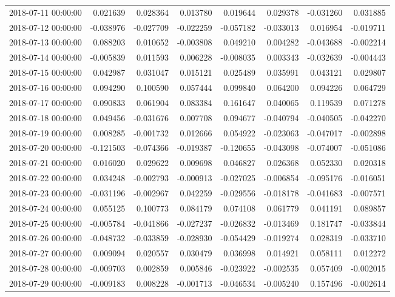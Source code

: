 \begin{tabular}{lrrrrrrr}
2018-07-11 00:00:00 & 0.021639 & 0.028364 & 0.013780 & 0.019644 & 0.029378 & -0.031260 & 0.031885 \\
2018-07-12 00:00:00 & -0.038976 & -0.027709 & -0.022259 & -0.057182 & -0.033013 & 0.016954 & -0.019711 \\
2018-07-13 00:00:00 & 0.088203 & 0.010652 & -0.003808 & 0.049210 & 0.004282 & -0.043688 & -0.002214 \\
2018-07-14 00:00:00 & -0.005839 & 0.011593 & 0.006228 & -0.008035 & 0.003343 & -0.032639 & -0.004443 \\
2018-07-15 00:00:00 & 0.042987 & 0.031047 & 0.015121 & 0.025489 & 0.035991 & 0.043121 & 0.029807 \\
2018-07-16 00:00:00 & 0.094290 & 0.100590 & 0.057444 & 0.099840 & 0.064200 & 0.094226 & 0.064729 \\
2018-07-17 00:00:00 & 0.090833 & 0.061904 & 0.083384 & 0.161647 & 0.040065 & 0.119539 & 0.071278 \\
2018-07-18 00:00:00 & 0.049456 & -0.031676 & 0.007708 & 0.094677 & -0.040794 & -0.040505 & -0.042270 \\
2018-07-19 00:00:00 & 0.008285 & -0.001732 & 0.012666 & 0.054922 & -0.023063 & -0.047017 & -0.002898 \\
2018-07-20 00:00:00 & -0.121503 & -0.074366 & -0.019387 & -0.120655 & -0.043098 & -0.074007 & -0.051086 \\
2018-07-21 00:00:00 & 0.016020 & 0.029622 & 0.009698 & 0.046827 & 0.026368 & 0.052330 & 0.020318 \\
2018-07-22 00:00:00 & 0.034248 & -0.002793 & -0.000913 & -0.027025 & -0.006854 & -0.095176 & -0.016051 \\
2018-07-23 00:00:00 & -0.031196 & -0.002967 & 0.042259 & -0.029556 & -0.018178 & -0.041683 & -0.007571 \\
2018-07-24 00:00:00 & 0.055125 & 0.100773 & 0.084179 & 0.074108 & 0.061779 & 0.041191 & 0.089857 \\
2018-07-25 00:00:00 & -0.005784 & -0.041866 & -0.027237 & -0.026832 & -0.013469 & 0.181747 & -0.033844 \\
2018-07-26 00:00:00 & -0.048732 & -0.033859 & -0.028930 & -0.054429 & -0.019274 & 0.028319 & -0.033710 \\
2018-07-27 00:00:00 & 0.009094 & 0.020557 & 0.030479 & 0.036998 & 0.014921 & 0.058111 & 0.012272 \\
2018-07-28 00:00:00 & -0.009703 & 0.002859 & 0.005846 & -0.023922 & -0.002535 & 0.057409 & -0.002015 \\
2018-07-29 00:00:00 & -0.009183 & 0.008228 & -0.001713 & -0.046534 & -0.005240 & 0.157496 & -0.002614 \\

\end{tabular}
